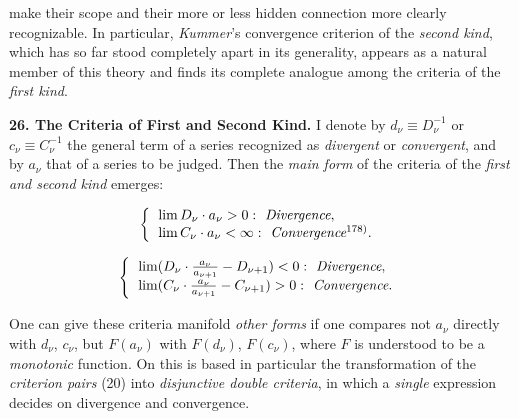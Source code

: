 \thispagestyle{fancy}

\vspace{0.5cm}

make their scope and their more or less hidden connection more clearly recognizable. In particular, \textit{Kummer}'s convergence criterion of the \textit{second kind}, which has so far stood completely apart in its generality, appears as a natural member of this theory and finds its complete analogue among the criteria of the \textit{first kind}.

\vspace{0.3cm}
\textbf{26. The Criteria of First and Second Kind.} I denote by $d_\nu \equiv D_\nu^{-1}$ or $c_\nu \equiv C_\nu^{-1}$ the general term of a series recognized as \textit{divergent} or \textit{convergent}, and by $a_\nu$ that of a series to be judged. Then the \textit{main form} of the criteria of the \textit{first and second kind} emerges:

\vspace{-0.5cm}
\begin{align}
    \left\{ 
    \begin{tabular}{l}
    $\lim D_\nu \cdot a_\nu > 0: \textit{ Divergence},$\\ 
    $\lim C_\nu \cdot a_\nu < \infty: \textit{ Convergence}\textsuperscript{178)}.$
    \end{tabular}
    \right.
\end{align}
\vspace{-0.5cm}

\vspace{-0.5cm}
\begin{align}
    \left\{ 
    \begin{tabular}{l}
    $\lim (D_\nu \cdot \frac{a_\nu}{a_{\nu+1}} - D_{\nu+1}) < 0: \textit{ Divergence},$\\ 
    $\lim  (C_\nu \cdot \frac{a_\nu}{a_{\nu+1}} - C_{\nu+1}) > 0: \textit{ Convergence}.$
    \end{tabular}
    \right.
\end{align}

One can give these criteria manifold \textit{other forms} if one compares not $a_\nu$ directly with $d_\nu$, $c_\nu$, but $F(a_\nu)$ with $F(d_\nu)$, $F(c_\nu)$, where $F$ is understood to be a \textit{monotonic} function. On this is based in particular the transformation of the \textit{criterion pairs} (20) into \textit{disjunctive double criteria}, in which a \textit{single} expression decides on divergence and convergence.

